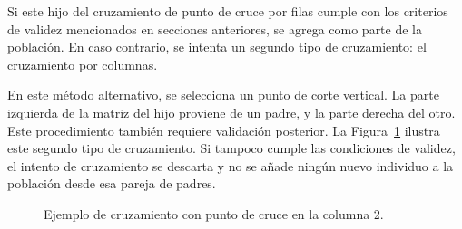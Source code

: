 Si este hijo del cruzamiento de punto de cruce por filas cumple con los criterios de validez mencionados en secciones anteriores, se agrega como parte de la población. 
En caso contrario, se intenta un segundo tipo de cruzamiento: el cruzamiento por columnas.

En este método alternativo, se selecciona un punto de corte vertical. La parte izquierda de la matriz del hijo proviene de un padre, y la parte derecha del otro. Este 
procedimiento también requiere validación posterior. La Figura~\ref{fig:cruzamiento-columnas} ilustra este segundo tipo de cruzamiento. Si tampoco cumple las 
condiciones de validez, el intento de cruzamiento se descarta y no se añade ningún nuevo individuo a la población desde esa pareja de padres.

\begin{figure}[htbp]
\centering
    
\caption{Ejemplo de cruzamiento con punto de cruce en la columna 2.}
\label{fig:cruzamiento-columnas}
\end{figure}

